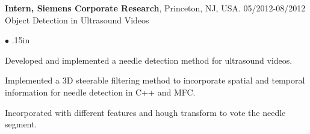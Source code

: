 \documentclass[line,margin]{res}
\newenvironment{bullets}{\begin{list}{\tiny$\bullet$}{\topsep 0pt \itemsep -2pt \leftmargin .15in}}{\vspace*{4pt}\end{list}}
\begin{document}
\begin{resume}
\textbf{Intern, Siemens Corporate Research}, Princeton, NJ, USA. \hfill      05/2012-08/2012 \\
Object Detection in Ultrasound Videos
\begin{bullets} 
\item Developed and implemented a needle detection method for ultrasound videos. 
\item Implemented a 3D steerable filtering method to incorporate spatial and temporal information for needle detection in C++ and MFC.
\item Incorporated with different features and hough transform to vote the needle segment.
\end{bullets}
\vspace{-.1in}


\end{resume}
\end{document}
